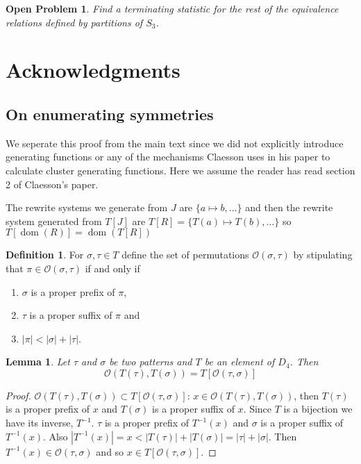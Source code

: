 \documentclass[a4paper, 11pt, english]{article}
\newcommand{\patternrule}{ \mapsto \!}
\newtheorem{lemma}[theorem]{Lemma}
\newtheorem{openproblem}[theorem]{Open Problem}
\theoremstyle{definition}
\newtheorem{definition}[theorem]{Definition}
\newcommand{\Sym}{S}
\newcommand{\Ocal}{\mathcal{O}}
\DeclareMathOperator{\dom}{dom}
\begin{document}
\begin{openproblem}
    Find a terminating statistic for the rest of the equivalence relations
    defined by partitions of $\Sym_3$.
\end{openproblem}

\section*{Acknowledgments}




\clearpage

\begin{appendices}
\section{On enumerating symmetries}
We seperate this proof from the main text since we did not explicitly introduce
generating functions or any of the mechanisms Claesson uses in his paper to
calculate cluster generating functions. Here we assume the reader has read
section 2 of Claesson's paper.

The rewrite systems we generate from $J$ are $\{ a \patternrule b, \dots \}$
and then the rewrite system generated from $T[J]$ are $T[R]=\{ T(a) \patternrule T(b), \dots \}$
so $T[\dom(R)]=\dom(T[R])$

\begin{definition}
    For $\sigma, \tau \in T$ define the set of permutations $\Ocal(\sigma,
    \tau)$ by stipulating that $\pi \in \Ocal(\sigma, \tau)$ if and only if
    \begin{enumerate}
    \item $\sigma$ is a proper prefix of $\pi$,
    \item $\tau$ is a proper suffix of $\pi$ and
    \item $|\pi| < |\sigma| + |\tau|$.
    \end{enumerate}
\end{definition}

\begin{lemma}
Let $\tau$ and $\sigma$ be two patterns and $T$ be an element of $D_4$.
Then 
\[
    \Ocal(T(\tau), T(\sigma)) = T[\Ocal(\tau, \sigma)]
\]
\end{lemma}
\begin{proof}
    $\Ocal(T(\tau), T(\sigma)) \subset T[\Ocal(\tau, \sigma)]$: 
    $x \in \Ocal(T(\tau), T(\sigma))$, then $T(\tau)$ is a proper prefix of
    $x$ and $T(\sigma)$ is a proper suffix of $x$. Since $T$ is a bijection we
    have its inverse, $T^{-1}$. $\tau$ is a proper prefix of $T^{-1}(x)$ and 
    $\sigma$ is a proper suffix of $T^{-1}(x)$. Also $|T^{-1}(x)| = x <
    |T(\tau)| + |T(\sigma)| = |\tau| + |\sigma|$. Then $T^{-1}(x) \in \Ocal(\tau,
    \sigma)$ and so $x \in T[\Ocal(\tau, \sigma)]$.


\end{proof}
\end{appendices}
\end{document}
